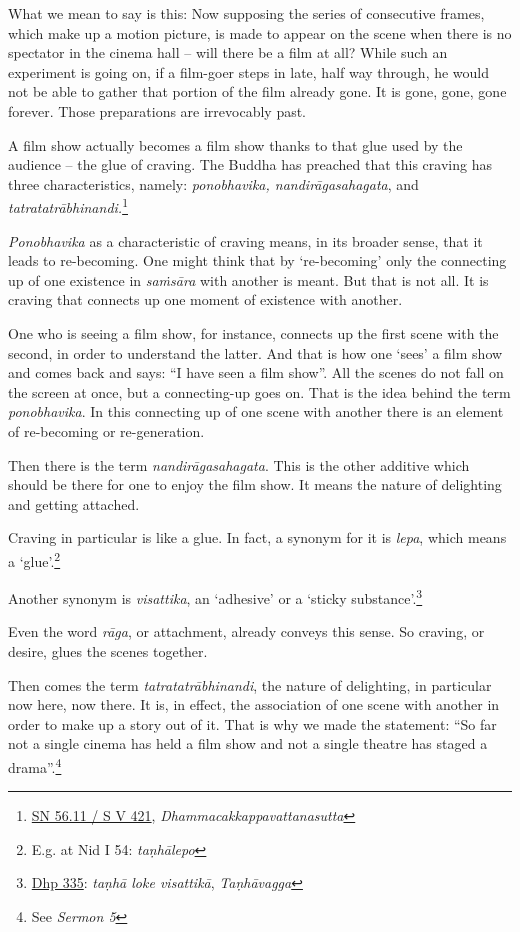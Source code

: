 What we mean to say is this: Now supposing the series of consecutive frames, which make up a motion picture, is made to appear on the scene when there is no spectator in the cinema hall -- will there be a film at all? While such an experiment is going on, if a film-goer steps in late, half way through, he would not be able to gather that portion of the film already gone. It is gone, gone, gone forever. Those preparations are irrevocably past.

A film show actually becomes a film show thanks to that glue used by the audience -- the glue of craving. The Buddha has preached that this craving has three characteristics, namely: \emph{ponobhavika, nandirāgasahagata}, and \emph{tatratatrābhinandi.}\footnote{\href{https://suttacentral.net/sn56.11/pli/ms}{SN 56.11 / S V 421}, \emph{Dhammacakkappavattanasutta}}

\emph{Ponobhavika} as a characteristic of craving means, in its broader sense, that it leads to re-becoming. One might think that by `re-becoming' only the connecting up of one existence in \emph{saṁsāra} with another is meant. But that is not all. It is craving that connects up one moment of existence with another.

One who is seeing a film show, for instance, connects up the first scene with the second, in order to understand the latter. And that is how one `sees' a film show and comes back and says: ``I have seen a film show''. All the scenes do not fall on the screen at once, but a connecting-up goes on. That is the idea behind the term \emph{ponobhavika}. In this connecting up of one scene with another there is an element of re-becoming or re-generation.

Then there is the term \emph{nandirāgasahagata}. This is the other additive which should be there for one to enjoy the film show. It means the nature of delighting and getting attached.

Craving in particular is like a glue. In fact, a synonym for it is \emph{lepa}, which means a `glue'.\footnote{E.g. at Nid I 54: \emph{taṇhālepo}}

Another synonym is \emph{visattika}, an `adhesive' or a `sticky substance'.\footnote{\href{https://suttacentral.net/dhp334-359/pli/ms}{Dhp 335}: \emph{taṇhā loke visattikā}, \emph{Taṇhāvagga}}

Even the word \emph{rāga}, or attachment, already conveys this sense. So craving, or desire, glues the scenes together.

Then comes the term \emph{tatratatrābhinandi}, the nature of delighting, in particular now here, now there. It is, in effect, the association of one scene with another in order to make up a story out of it. That is why we made the statement: ``So far not a single cinema has held a film show and not a single theatre has staged a drama''.\footnote{See \emph{Sermon 5}}

